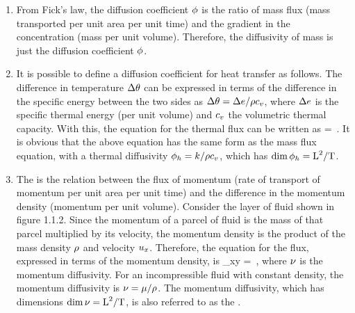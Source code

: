 \begin{enumerate}
\item From Fick's law, the diffusion coefficient $\phi$ is the ratio of mass flux (mass transported per unit area per unit time) and the gradient in the concentration (mass per unit volume). Therefore, the diffusivity of mass is just the diffusion coefficient $\phi$.

\item It is possible to define a diffusion coefficient for heat transfer as follows. The difference in temperature $\Delta\theta$ can be expressed in terms of the difference in the specific energy between the two sides as $\Delta\theta = \Delta e/\rho c_v$, where $\Delta e$ is the specific thermal energy (per unit volume) and $c_v$ the volumetric thermal capacity. With this, the equation for the thermal flux can be written as
\beq
\flux\then = \dfrac{\Dx\then}{\length}\,.
\eeq
It is obvious that the above equation has the same form as the mass flux equation, with a thermal diffusivity $\phi_h = k/\rho c_v$, which has $\dim\phi_h = \text{L}^2/\text{T}$.

\item The  is the relation between the flux of momentum (rate of transport of momentum per unit area per unit time) and the difference in the momentum density (momentum per unit volume). Consider the layer of fluid shown in figure 1.1.2. Since the momentum of a parcel of fluid is the mass of that parcel multiplied by its velocity, the momentum density is the product of the mass density $\rho$ and velocity $u_x$. Therefore, the equation for the flux, expressed in terms of the momentum density, is
\beq
\shear_{xy} = \kinvis{}\,,
\eeq
where $\nu$ is the momentum diffusivity. For an incompressible fluid with constant density, the momentum diffusivity is $\nu = \mu/\rho$. The momentum diffusivity, which has dimensions $\dim\nu = \text{L}^2/\text{T}$, is also referred to as the .
\end{enumerate}

